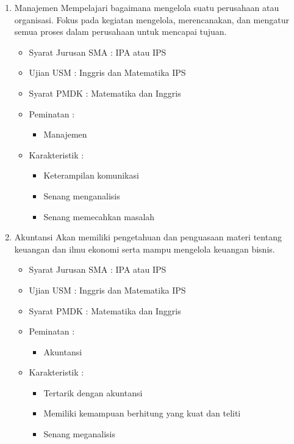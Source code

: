 \documentclass[a4paper,twoside]{article}
\begin{document}
\begin{enumerate}
\begin{enumerate}
\begin{enumerate}
				\item Manajemen
					Mempelajari bagaimana mengelola suatu perusahaan atau organisasi. Fokus pada kegiatan mengelola, merencanakan, dan mengatur semua proses dalam perusahaan untuk mencapai tujuan.
					\begin{itemize}
						\item Syarat Jurusan SMA : IPA atau IPS
						\item Ujian USM : Inggris dan Matematika IPS
						\item Syarat PMDK : Matematika dan Inggris
						\item Peminatan :
						\begin{itemize}
							\item Manajemen 
						\end{itemize}
						\item Karakteristik :
						\begin{itemize}
							\item Keterampilan komunikasi
							\item Senang menganalisis
							\item Senang memecahkan masalah
						\end{itemize}
					\end{itemize}									
				
				\item Akuntansi
					Akan memiliki pengetahuan dan penguasaan materi tentang keuangan dan ilmu ekonomi serta mampu mengelola keuangan bisnis.				
					\begin{itemize}
						\item Syarat Jurusan SMA : IPA atau IPS
						\item Ujian USM : Inggris dan Matematika IPS
						\item Syarat PMDK : Matematika dan Inggris
						\item Peminatan :
						\begin{itemize}
							\item Akuntansi 
						\end{itemize}
						\item Karakteristik :
						\begin{itemize}
							\item Tertarik dengan akuntansi
							\item Memiliki kemampuan berhitung yang kuat dan teliti
							\item Senang meganalisis
						\end{itemize}
					\end{itemize}
					

\end{enumerate}
\end{enumerate}
\end{enumerate}
\end{document}
